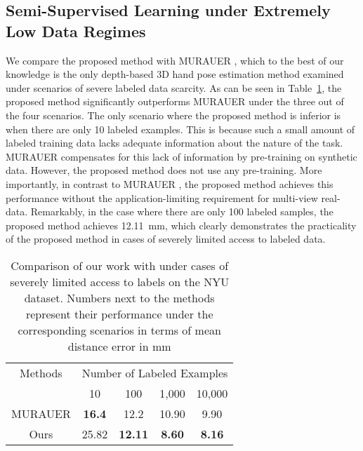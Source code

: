 \documentclass{article}
\begin{document}
\subsection{Semi-Supervised Learning under Extremely Low Data Regimes}
We compare the proposed method with MURAUER \cite{poier2019murauer}, which to the best of our knowledge is the only depth-based 3D hand pose estimation method examined under scenarios of severe labeled data scarcity. As can be seen in Table~\ref{tbl:comparison_low}, the proposed method significantly outperforms MURAUER \cite{poier2019murauer} under the three out of the four scenarios. The only scenario where the proposed method is inferior is when there are only 10 labeled examples. This is because such a small amount of labeled training data lacks adequate information about the nature of the task. MURAUER \cite{poier2019murauer} compensates for this lack of information by pre-training on synthetic data. However, the proposed method does not use any pre-training. More importantly, in contrast to MURAUER \cite{poier2019murauer}, the proposed method achieves this performance without the application-limiting requirement for multi-view real-data. Remarkably, in the case where there are only 100 labeled samples, the proposed method achieves 12.11~mm, which clearly demonstrates the practicality of the proposed method in cases of severely limited access to labeled data. 

\begin{table}[!h]
  \begin{center}
   \caption{Comparison of our work with \cite{poier2019murauer} under cases of severely limited access to labels on the NYU dataset. Numbers next to the methods represent their performance under the corresponding scenarios in terms of mean distance error in mm}
   \label{table:comparision_low}
   \setlength{\tabcolsep}{8pt}
  \begin{tabular}{|c|cccc|}
    \hline
    Methods & \multicolumn{4}{|c|}{Number of Labeled Examples} \\
& 10 & 100 & 1,000 & 10,000 \\\hline

MURAUER \cite{poier2019murauer} & \textbf{16.4} &  12.2 &  10.90 &  9.90 \\
Ours & 25.82 & \textbf{12.11}& \textbf{8.60}&  \textbf{8.16}\\
   \hline  
  \end{tabular}
 
  \label{tbl:comparison_low}
  \end{center}
\end{table}
\end{document}
